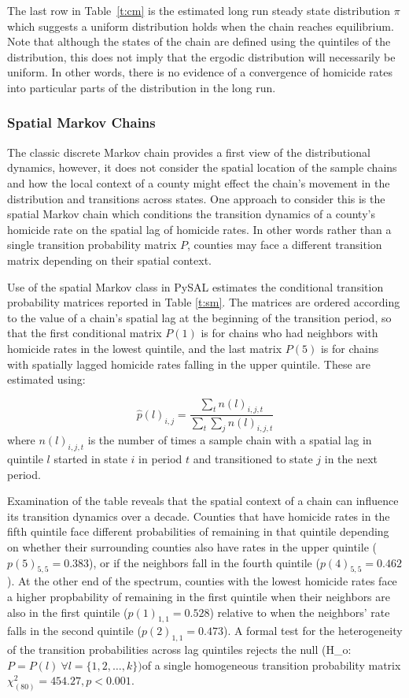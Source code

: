 \documentclass[11pt, titlepage]{article}
\begin{document}
The last row in Table~\ref{t:cm} is the estimated long run steady state
distribution $\pi$ which suggests a uniform distribution holds when the chain
reaches equilibrium. Note that although the states of the chain are
defined using the quintiles of the distribution, this does not imply
that the ergodic distribution will necessarily be uniform. In other
words, there is no evidence of a convergence of homicide rates into
particular parts of the distribution in the long run.

\subsubsection{Spatial Markov Chains}

The classic discrete Markov chain provides a first view of the
distributional dynamics, however, it does not consider the spatial
location of the sample chains and how the local context of a county
might effect the chain's movement in the distribution and transitions
across states. One approach to consider this is the spatial Markov chain
which conditions the transition dynamics of a county's homicide rate on
the spatial lag of homicide rates. In other words rather than a single
transition probability matrix $P$, counties may face a different
transition matrix depending on their spatial context.

Use of the spatial Markov class in PySAL estimates the conditional
transition probability matrices reported in Table \ref{t:sm}. The matrices are
ordered according to the value of a chain's spatial lag at the beginning
of the transition period, so that the first conditional matrix $P(1)$ is
for chains who had neighbors with homicide rates in the lowest quintile,
and the last matrix $P(5)$ is for chains with spatially lagged homicide
rates falling in the upper quintile. These are estimated using:

\begin{equation}
\hat{p}(l)_{i,j} = \frac{\sum_t n(l)_{i,j,t}}{\sum_t \sum_j n(l)_{i,j,t}} 
\label{e:cm}
\end{equation}
where $n(l)_{i,j,t}$ is the number of times a sample chain with a
spatial lag in quintile $l$ started in state $i$
in period $t$ and transitioned to state $j$ in the next period.

Examination of the table reveals that the spatial context of a chain can
influence its transition dynamics over a decade. Counties that have
homicide rates in the fifth quintile face different probabilities of
remaining in that quintile depending on whether their surrounding
counties also have rates in the upper quintile ($p(5)_{5,5} = 0.383$),
or if the neighbors fall in the fourth quintile ($p(4)_{5,5}=0.462$). At
the other end of the spectrum, counties with the lowest homicide rates
face a higher propbability of remaining in the first quintile when their
neighbors are also in the first quintile ($p(1)_{1,1}=0.528$) relative
to when the neighbors' rate falls in the second quintile
($p(2)_{1,1}=0.473$). A formal test for the heterogeneity of the
transition probabilities across lag quintiles rejects the null (H\_o:
$P=P(l) \ \forall l=\{1,2,\ldots,k\})$of a single homogeneous transition
probability matrix $\chi_{(80)}^2=454.27, p<0.001$.
\end{document}
